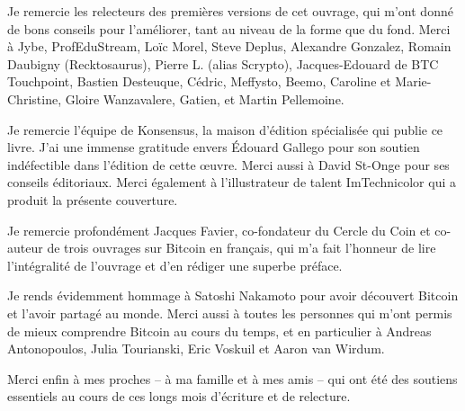 Je remercie les relecteurs des premières versions de cet ouvrage, qui m'ont donné de bons conseils pour l'améliorer, tant au niveau de la forme que du fond. Merci à Jybe, ProfEduStream, Loïc Morel, Steve Deplus, Alexandre Gonzalez, Romain Daubigny (Recktosaurus), Pierre L. (alias Scrypto), Jacques-Edouard de BTC Touchpoint, Bastien Desteuque, Cédric, Meffysto, Beemo, Caroline et Marie-Christine, Gloire Wanzavalere, Gatien, et Martin Pellemoine.

Je remercie l'équipe de Konsensus, la maison d'édition spécialisée qui publie ce livre. J'ai une immense gratitude envers Édouard Gallego pour son soutien indéfectible dans l'édition de cette œuvre. Merci aussi à David St-Onge pour ses conseils éditoriaux. Merci également à l'illustrateur de talent ImTechnicolor qui a produit la présente couverture.

Je remercie profondément Jacques Favier, co-fondateur du Cercle du Coin et co-auteur de trois ouvrages sur Bitcoin en français, qui m'a fait l'honneur de lire l'intégralité de l'ouvrage et d'en rédiger une superbe préface.

Je rends évidemment hommage à Satoshi Nakamoto pour avoir découvert Bitcoin et l'avoir partagé au monde. Merci aussi à toutes les personnes qui m'ont permis de mieux comprendre Bitcoin au cours du temps, et en particulier à Andreas Antonopoulos, Julia Tourianski, Eric Voskuil et Aaron van Wirdum.

Merci enfin à mes proches -- à ma famille et à mes amis -- qui ont été des soutiens essentiels au cours de ces longs mois d'écriture et de relecture.